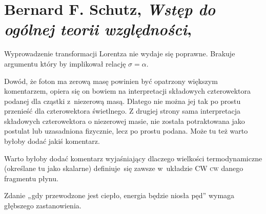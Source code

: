 \documentclass[a4paper,11pt]{article}
\numberwithin{equation}{section}
\begin{document}
\section{Bernard F. Schutz,
  \textit{Wstęp do ogólnej teorii względności},
  \cite{SchutzWstepDoOgolnejTeoriiWzglednosci2002}}

\vspace{0em}



\vspace{0em}


\noindent
{} Wyprowadzenie transformacji Lorentza nie wydaje się poprawne.
Brakuje argumentu który by implikował relację $\sigma = \alpha$.

\VerSpaceFour





\noindent
{} Dowód, że foton ma zerową masę powinien być opatrzony większym
komentarzem, opiera się on bowiem na interpretacji składowych czterowektora
podanej dla cząstki z~niezerową masą. Dlatego nie można jej tak po prostu
przenieść dla czterowektora świetlnego. Z drugiej strony sama interpretacja
składowych czterowektora o niezerowej masie, nie została potraktowana jako
postulat lub uzasadniona fizycznie, lecz po prostu podana. Może tu też warto
byłoby dodać jakiś komentarz.

\VerSpaceFour





\noindent
{} Warto byłoby dodać komentarz wyjaśniający dlaczego
wielkości termodynamiczne (określane tu jako skalarne) definiuje~się
zawsze w~układzie CW \textsc{cw} danego fragmentu płynu.

\VerSpaceFour





\noindent
{} Zdanie „gdy przewodzone jest ciepło, energia będzie niosła pęd”
wymaga głębszego zastanowienia.





\newpage

\end{document}
